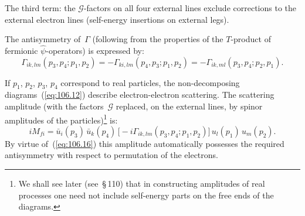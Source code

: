 
\noindent The third term: the $\mathcal{G}$-factors on all four external lines exclude corrections to the external electron lines (self-energy insertions on external legs).


The antisymmetry of~$\Gamma$ (following from the properties of the $T$-product of fermionic $\hat{\psi}$-operators) is expressed by:
\begin{equation}
\Gamma_{ik,lm}(p_3, p_4; p_1, p_2) = -\Gamma_{ki,lm}(p_4, p_3; p_1, p_2) = -\Gamma_{ik,ml}(p_3, p_4; p_2, p_1).
\label{eq:106.16}
\end{equation}

If $p_1$, $p_2$, $p_3$, $p_4$ correspond to real particles, the non-decomposing diagrams~(\ref{eq:106.12}) describe electron-electron scattering. The scattering amplitude (with the factors~$\mathcal{G}$ replaced, on the external lines, by spinor amplitudes of the particles)\footnote{We shall see later (see~\S\,110) that in constructing amplitudes of real processes one need not include self-energy parts on the free ends of the diagrams.} is:
\begin{equation}
iM_{fi} = \bar{u}_i(p_3)\,\bar{u}_k(p_4)\,\bigl[-i\Gamma_{ik,lm}(p_3, p_4; p_1, p_2)\bigr]\,u_l(p_1)\,u_m(p_2).
\label{eq:106.17}
\end{equation}
By virtue of~(\ref{eq:106.16}) this amplitude automatically possesses the required antisymmetry with respect to permutation of the electrons.
